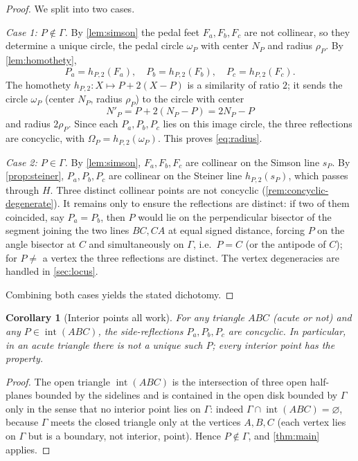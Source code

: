 \documentclass[11pt,a4paper]{article}
\newtheorem{corollary}[theorem]{Corollary}
\theoremstyle{definition}
\newcommand{\Pa}{P_{a}}
\newcommand{\Pb}{P_{b}}
\newcommand{\Pc}{P_{c}}
\newcommand{\Fa}{F_{a}}
\newcommand{\Fb}{F_{b}}
\newcommand{\Fc}{F_{c}}
\newcommand{\circc}{\Gamma}
\newcommand{\pedalc}{\omega_{P}}
\newcommand{\reflc}{\Omega_{P}}
\begin{document}
\begin{proof}
We split into two cases.

\smallskip
\emph{Case 1: $P\notin\circc$.} By \cref{lem:simson} the pedal feet $\Fa,\Fb,\Fc$ are not collinear, so they determine a unique circle, the pedal circle $\pedalc$ with center $N_{P}$ and radius $\rho_{P}$. By \cref{lem:homothety},
\[
\Pa=h_{P,2}(\Fa),\quad \Pb=h_{P,2}(\Fb),\quad \Pc=h_{P,2}(\Fc).
\]
The homothety $h_{P,2}:X\mapsto P+2(X-P)$ is a similarity of ratio $2$; it sends the circle $\pedalc$ (center $N_{P}$, radius $\rho_{P}$) to the circle with center
\begin{equation}\label{eq:center-image}
N'_{P}=P+2(N_{P}-P)=2N_{P}-P
\end{equation}
and radius $2\rho_{P}$. Since each $\Pa,\Pb,\Pc$ lies on this image circle, the three reflections are concyclic, with $\reflc=h_{P,2}(\pedalc)$. This proves \cref{eq:radius}.

\smallskip
\emph{Case 2: $P\in\circc$.} By \cref{lem:simson}, $\Fa,\Fb,\Fc$ are collinear on the Simson line $s_{P}$. By \cref{prop:steiner}, $\Pa,\Pb,\Pc$ are collinear on the Steiner line $h_{P,2}(s_{P})$, which passes through $H$. Three distinct collinear points are not concyclic (\cref{rem:concyclic-degenerate}). It remains only to ensure the reflections are distinct: if two of them coincided, say $\Pa=\Pb$, then $P$ would lie on the perpendicular bisector of the segment joining the two lines $BC,CA$ at equal signed distance, forcing $P$ on the angle bisector at $C$ and simultaneously on $\circc$, i.e.\ $P=C$ (or the antipode of $C$); for $P\neq$ a vertex the three reflections are distinct. The vertex degeneracies are handled in \cref{sec:locus}.

\smallskip
Combining both cases yields the stated dichotomy.
\end{proof}

\begin{corollary}[Interior points all work]\label{cor:interior}
For any triangle $ABC$ (acute or not) and any $P\in\operatorname{int}(ABC)$, the side-reflections $\Pa,\Pb,\Pc$ are concyclic. In particular, in an acute triangle there is not a unique such $P$; every interior point has the property.
\end{corollary}
\begin{proof}
The open triangle $\operatorname{int}(ABC)$ is the intersection of three open half-planes bounded by the sidelines and is contained in the open disk bounded by $\circc$ only in the sense that no interior point lies on $\circc$: indeed $\circc\cap\operatorname{int}(ABC)=\varnothing$, because $\circc$ meets the closed triangle only at the vertices $A,B,C$ (each vertex lies on $\circc$ but is a boundary, not interior, point). Hence $P\notin\circc$, and \cref{thm:main} applies.
\end{proof}
\end{document}
